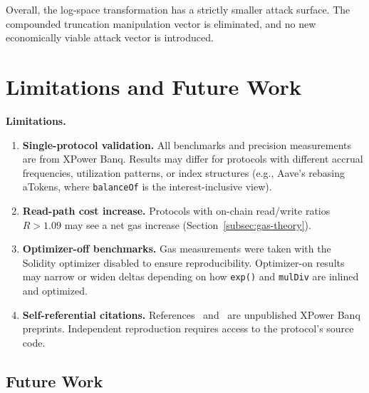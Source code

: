 \documentclass[10pt,a4paper,twocolumn]{article}
\theoremstyle{definition}
\theoremstyle{plain}
\theoremstyle{remark}
\begin{document}
Overall, the log-space transformation has a strictly smaller attack surface. The compounded truncation manipulation vector is eliminated, and no new economically viable attack vector is introduced.

\section{Limitations and Future Work}
\label{sec:limitations}

\noindent\textbf{Limitations.}

\begin{enumerate}[leftmargin=*, nosep]
\item \textbf{Single-protocol validation.} All benchmarks and precision measurements are from XPower Banq. Results may differ for protocols with different accrual frequencies, utilization patterns, or index structures (e.g., Aave's rebasing aTokens, where \texttt{balanceOf} is the interest-inclusive view).

\item \textbf{Read-path cost increase.} Protocols with on-chain read/write ratios $R > 1.09$ may see a net gas increase (Section~\ref{subsec:gas-theory}).

\item \textbf{Optimizer-off benchmarks.} Gas measurements were taken with the Solidity optimizer disabled to ensure reproducibility. Optimizer-on results may narrow or widen deltas depending on how \texttt{exp()} and \texttt{mulDiv} are inlined and optimized.

\item \textbf{Self-referential citations.} References~\cite{wp} and~\cite{lck} are unpublished XPower Banq preprints. Independent reproduction requires access to the protocol's source code.
\end{enumerate}

\subsection{Future Work}
\label{subsec:future-work}
\end{document}
